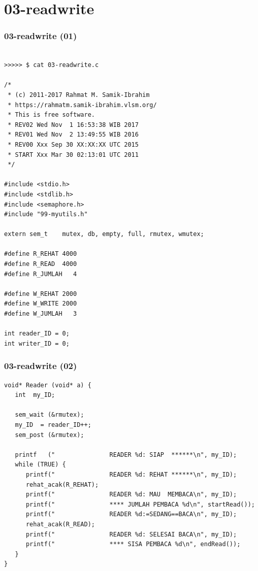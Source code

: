 \documentclass[aspectratio=169, xcolor=table, notheorems, hyperref={pdfpagelabels=false}]{beamer}
\begin{document}
\section{03-readwrite}
\begin{frame}[fragile]
\frametitle{03-readwrite (01)}
\begin{lstlisting}[basicstyle=\ttfamily\tiny]

>>>>> $ cat 03-readwrite.c

/*
 * (c) 2011-2017 Rahmat M. Samik-Ibrahim
 * https://rahmatm.samik-ibrahim.vlsm.org/
 * This is free software.
 * REV02 Wed Nov  1 16:53:38 WIB 2017
 * REV01 Wed Nov  2 13:49:55 WIB 2016
 * REV00 Xxx Sep 30 XX:XX:XX UTC 2015
 * START Xxx Mar 30 02:13:01 UTC 2011
 */

#include <stdio.h>
#include <stdlib.h>
#include <semaphore.h>
#include "99-myutils.h"

extern sem_t    mutex, db, empty, full, rmutex, wmutex;

#define R_REHAT 4000
#define R_READ  4000
#define R_JUMLAH   4

#define W_REHAT 2000
#define W_WRITE 2000
#define W_JUMLAH   3

int reader_ID = 0;
int writer_ID = 0;

\end{lstlisting}
\end{frame}

\begin{frame}[fragile]
\frametitle{03-readwrite (02)}
\begin{lstlisting}[basicstyle=\ttfamily\footnotesize]
void* Reader (void* a) {
   int  my_ID;

   sem_wait (&rmutex);
   my_ID  = reader_ID++;
   sem_post (&rmutex);

   printf   ("               READER %d: SIAP  ******\n", my_ID);
   while (TRUE) {
      printf("               READER %d: REHAT ******\n", my_ID);
      rehat_acak(R_REHAT);
      printf("               READER %d: MAU  MEMBACA\n", my_ID);
      printf("               **** JUMLAH PEMBACA %d\n", startRead());
      printf("               READER %d:=SEDANG==BACA\n", my_ID);
      rehat_acak(R_READ);
      printf("               READER %d: SELESAI BACA\n", my_ID);
      printf("               **** SISA PEMBACA %d\n", endRead());
   }
}

\end{lstlisting}
\end{frame}
\end{document}
